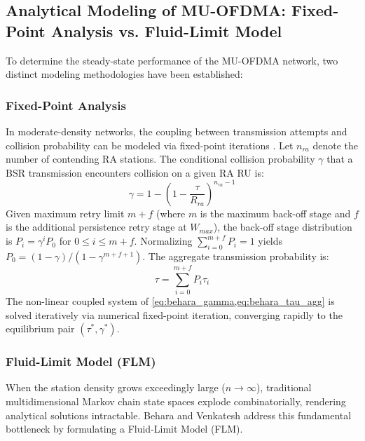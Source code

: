 \subsection{Analytical Modeling of MU-OFDMA: Fixed-Point Analysis vs. Fluid-Limit Model}
To determine the steady-state performance of the MU-OFDMA network, two distinct modeling methodologies have been established:

\subsubsection{Fixed-Point Analysis}
In moderate-density networks, the coupling between transmission attempts and collision probability can be modeled via fixed-point iterations \cite{behara2023performance}. Let $n_{ra}$ denote the number of contending RA stations. The conditional collision probability $\gamma$ that a BSR transmission encounters collision on a given RA RU is:
\begin{equation}
    \gamma = 1 - \left(1 - \frac{\tau}{R_{ra}}\right)^{n_{ra} - 1}
    \label{eq:behara_gamma}
\end{equation}
Given maximum retry limit $m + f$ (where $m$ is the maximum back-off stage and $f$ is the additional persistence retry stage at $W_{max}$), the back-off stage distribution is $P_i = \gamma^i P_0$ for $0 \le i \le m+f$. Normalizing $\sum_{i=0}^{m+f} P_i = 1$ yields $P_0 = (1 - \gamma) / (1 - \gamma^{m+f+1})$. The aggregate transmission probability is:
\begin{equation}
    \tau = \sum_{i=0}^{m+f} P_i \tau_i
    \label{eq:behara_tau_agg}
\end{equation}
The non-linear coupled system of \cref{eq:behara_gamma,eq:behara_tau_agg} is solved iteratively via numerical fixed-point iteration, converging rapidly to the equilibrium pair $(\tau^*, \gamma^*)$.

\subsubsection{Fluid-Limit Model (FLM)}
When the station density grows exceedingly large ($n \to \infty$), traditional multidimensional Markov chain state spaces explode combinatorially, rendering analytical solutions intractable. Behara and Venkatesh \cite{behara2022fluid} address this fundamental bottleneck by formulating a Fluid-Limit Model (FLM).

